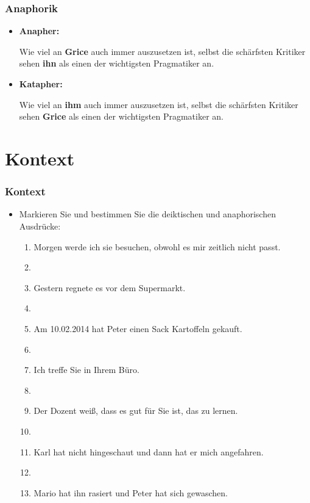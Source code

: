 
\begin{frame}
\frametitle{Anaphorik}

\begin{itemize}
	\item \textbf{Anapher:}
	
	\ea Wie viel an \textbf{Grice} auch immer auszusetzen ist, selbst die schärfsten Kritiker sehen \textbf{ihn} als einen der wichtigsten Pragmatiker an.
	\z
	
	\item \textbf{Katapher:}
	
	\ea Wie viel an \textbf{ihm} auch immer auszusetzen ist, selbst die schärfsten Kritiker sehen \textbf{Grice} als einen der wichtigsten Pragmatiker an.
	\z
	
\end{itemize}

\end{frame}


%
\section{Kontext}
%

\begin{frame}
\frametitle{Kontext}

\begin{itemize}
	\item Markieren Sie und bestimmen Sie die deiktischen und anaphorischen Ausdrücke:
	
\vspace{5mm}
	
	\begin{enumerate}
	\item Morgen werde ich sie besuchen, obwohl es mir zeitlich nicht passt.
	\item[]
	\item Gestern regnete es vor dem Supermarkt.
	\item[]
	\item Am 10.02.2014 hat Peter einen Sack Kartoffeln gekauft.
	\item[]
	\item Ich treffe Sie in Ihrem Büro.
	\item[]
	\item Der Dozent wei\ss{}, dass es gut für Sie ist, das zu lernen.
	\item[]
	\item Karl hat nicht hingeschaut und dann hat er mich angefahren.
	\item[]
	\item Mario hat ihn rasiert und Peter hat sich gewaschen.
	\end{enumerate}
	
\end{itemize}

\end{frame}


